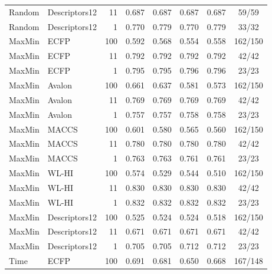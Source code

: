 \begin{longtable}{llrccccc}
Random & Descriptors12 & 11 & 0.687 & 0.687 & 0.687 & 0.687 & 59/59 \\

Random & Descriptors12 & 1 & 0.770 & 0.779 & 0.770 & 0.779 & 33/32 \\

MaxMin & ECFP & 100 & 0.592 & 0.568 & 0.554 & 0.558 & 162/150 \\

MaxMin & ECFP & 11 & 0.792 & 0.792 & 0.792 & 0.792 & 42/42 \\

MaxMin & ECFP & 1 & 0.795 & 0.795 & 0.796 & 0.796 & 23/23 \\

MaxMin & Avalon & 100 & 0.661 & 0.637 & 0.581 & 0.573 & 162/150 \\

MaxMin & Avalon & 11 & 0.769 & 0.769 & 0.769 & 0.769 & 42/42 \\

MaxMin & Avalon & 1 & 0.757 & 0.757 & 0.758 & 0.758 & 23/23 \\

MaxMin & MACCS & 100 & 0.601 & 0.580 & 0.565 & 0.560 & 162/150 \\

MaxMin & MACCS & 11 & 0.780 & 0.780 & 0.780 & 0.780 & 42/42 \\

MaxMin & MACCS & 1 & 0.763 & 0.763 & 0.761 & 0.761 & 23/23 \\

MaxMin & WL-HI & 100 & 0.574 & 0.529 & 0.544 & 0.510 & 162/150 \\

MaxMin & WL-HI & 11 & 0.830 & 0.830 & 0.830 & 0.830 & 42/42 \\

MaxMin & WL-HI & 1 & 0.832 & 0.832 & 0.832 & 0.832 & 23/23 \\

MaxMin & Descriptors12 & 100 & 0.525 & 0.524 & 0.524 & 0.518 & 162/150 \\

MaxMin & Descriptors12 & 11 & 0.671 & 0.671 & 0.671 & 0.671 & 42/42 \\

MaxMin & Descriptors12 & 1 & 0.705 & 0.705 & 0.712 & 0.712 & 23/23 \\

Time & ECFP & 100 & 0.691 & 0.681 & 0.650 & 0.668 & 167/148 \\


\end{longtable}
